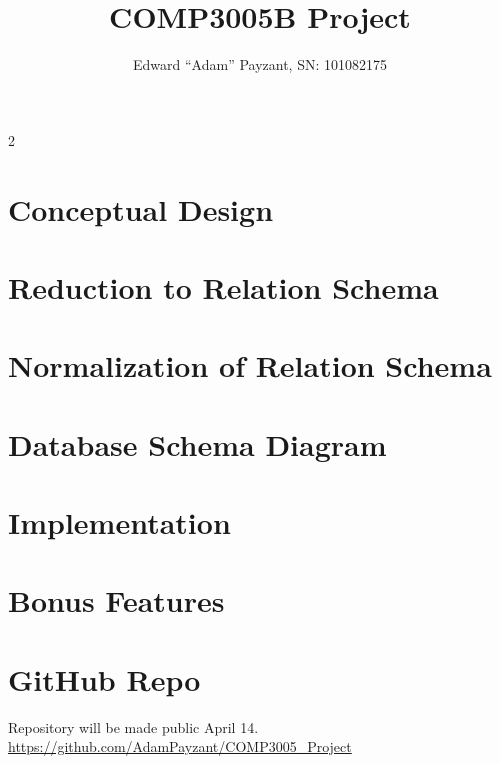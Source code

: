 \documentclass[titlepage, oneside]{article}
\begin{document}
    \author{Edward ``Adam'' Payzant, SN: 101082175}
    \title{COMP3005B Project}2
    \maketitle

    \section{Conceptual Design}
        
    \section{Reduction to Relation Schema}
    \section{Normalization of Relation Schema}
    \section{Database Schema Diagram}
    \section{Implementation}
    \section{Bonus Features}
    \section{GitHub Repo}
        Repository will be made public April 14. \\
        \url{https://github.com/AdamPayzant/COMP3005_Project}
\end{document}
